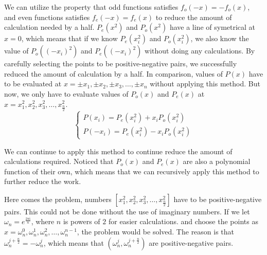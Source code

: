 \documentclass[12pt]{article}
\begin{document}
We can utilize the property that odd functions satisfies $f_o(-x)=-f_o(x)$, 
and even functions satisfies $f_e(-x)=f_e(x)$ to reduce the amount of calculation needed by a half. 
$P_e(x^2)$ and $P_o(x^2)$ have a line of symetrical at $x=0$, 
which means that if we know $P_e(x_i^2)$ and $P_o(x_i^2)$, we also know the value of $P_o((-x_i)^2)$ 
and $P_e((-x_i)^2)$ without doing any calculations. By carefully selecting the points to be positive-negative pairs, 
we successfully reduced the amount of calculation by a half. In comparison, values of $P(x)$ have to be evaluated at 
$x=\pm x_1,\pm x_2,\pm x_3,\dots,\pm x_n$ without applying this method. But now, we only have to evaluate values of 
$P_o(x)$ and $P_e(x)$ at $x=x_1^2,x_2^2,x_3^2,\dots,x_{\frac{n}{2}}^2$.
$$\begin{cases}
    P(x_i) = P_e(x_i^2) + x_iP_o(x_i^2)    \\
    P(-x_i) = P_e(x_i^2) - x_iP_o(x_i^2)
\end{cases}$$

We can continue to apply this method to continue reduce the amount of calculations required. 
Noticed that $P_o(x)$ and $P_e(x)$ are also a polynomial function of their own, 
which means that we can recursively apply this method to further reduce the work. 

Here comes the problem, numbers $[x_1^2,x_2^2,x_3^2,\dots,x_{\frac{n}{2}}^2]$ have to be positive-negative pairs. 
This could not be done without the use of imaginary numbers. If we let $\omega_n = e^{\frac{2\pi \mathrm{i}}{n}}$, 
where $n$ is powers of $2$ for easier calculations.
and choose the points as $x=\omega_n^0,\omega_n^1,\omega_n^2,\dots,\omega_n^{n-1}$, the problem would be solved. 
The reason is that $\omega_n^{j+\frac{n}{2}} = -\omega_n^{j}$, which means that 
$(\omega_n^{j},\omega_n^{j+\frac{n}{2}})$ are positive-negative pairs. 
\end{document}
